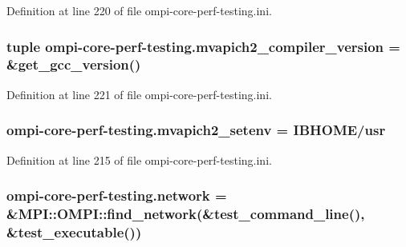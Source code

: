 Definition at line 220 of file ompi-\/core-\/perf-\/testing.\-ini.

\hypertarget{namespaceompi-core-perf-testing_ab1de3bdc144731e9639d76187ffa8078}{
\subsubsection[{mvapich2\-\_\-compiler\-\_\-version}]{\setlength{\rightskip}{0pt plus 5cm}tuple ompi-\/core-\/perf-\/testing.\-mvapich2\-\_\-compiler\-\_\-version = \&get\-\_\-gcc\-\_\-version()}}\label{namespaceompi-core-perf-testing_ab1de3bdc144731e9639d76187ffa8078}


Definition at line 221 of file ompi-\/core-\/perf-\/testing.\-ini.

\hypertarget{namespaceompi-core-perf-testing_a68002d4d6e6a04e05980c8b2ae5b545e}{
\subsubsection[{mvapich2\-\_\-setenv}]{\setlength{\rightskip}{0pt plus 5cm}ompi-\/core-\/perf-\/testing.\-mvapich2\-\_\-setenv = I\-B\-H\-O\-M\-E/usr}}\label{namespaceompi-core-perf-testing_a68002d4d6e6a04e05980c8b2ae5b545e}


Definition at line 215 of file ompi-\/core-\/perf-\/testing.\-ini.

\hypertarget{namespaceompi-core-perf-testing_aba864d853cd3697f3a66573fef630d72}{
\subsubsection[{network}]{\setlength{\rightskip}{0pt plus 5cm}ompi-\/core-\/perf-\/testing.\-network = \&M\-P\-I\-::\-O\-M\-P\-I\-::find\-\_\-network(\&test\-\_\-command\-\_\-line(), \&test\-\_\-executable())}}\label{namespaceompi-core-perf-testing_aba864d853cd3697f3a66573fef630d72}



